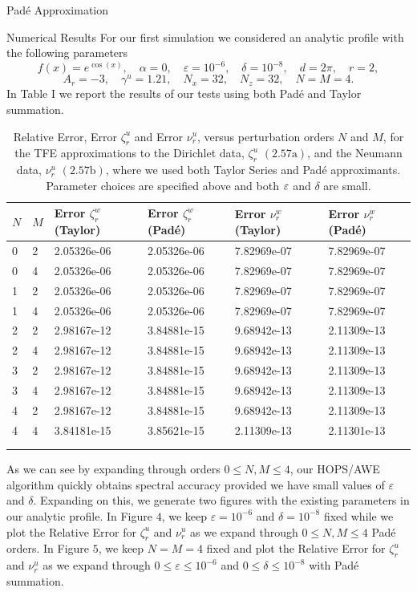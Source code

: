 \begin{section}{Pad\'e Approximation}
\begin{section}{Numerical Results}
For our first simulation we considered an analytic profile with the following parameters
$$f(x)=e^{\cos(x)},\quad \alpha = 0, \quad \varepsilon = 10^{-6}, \quad \delta = 10^{-8}, \quad d=2\pi,\quad r=2,$$
$$A_r=-3,\quad \gamma^u = 1.21, \quad N_x = 32,\quad N_z=32, \quad N=M=4.$$
In Table I we report the results of our tests using both Padé and Taylor summation.
\vspace{3mm}
\label{First Numerical Tests Upper Layer}
\setcounter{table}{0}
\begin{longtable}[c]{llllll} \toprule
    {$N$} & {$M$} & {Error ${\zeta^w_r}$ (Taylor)} & {Error $\zeta^w_r$ (Padé)} & {Error $\nu^w_r$ (Taylor)} & {Error $\nu^w_r$ (Padé)}  \\ \midrule
0 & 2 & 2.05326e-06 & 2.05326e-06 & 7.82969e-07 & 7.82969e-07 \\
0 & 4 & 2.05326e-06 & 2.05326e-06 & 7.82969e-07 & 7.82969e-07 \\
1 & 2 & 2.05326e-06 & 2.05326e-06 & 7.82969e-07 & 7.82969e-07 \\
1 & 4 & 2.05326e-06 & 2.05326e-06 & 7.82969e-07 & 7.82969e-07 \\
2 & 2 & 2.98167e-12 & 3.84881e-15 & 9.68942e-13 & 2.11309e-13 \\
2 & 4 & 2.98167e-12 & 3.84881e-15 & 9.68942e-13 & 2.11309e-13 \\
3 & 2 & 2.98167e-12 & 3.84881e-15 & 9.68942e-13 & 2.11309e-13 \\
3 & 4 & 2.98167e-12 & 3.84881e-15 & 9.68942e-13 & 2.11309e-13 \\
4 & 2 & 2.98167e-12 & 3.84881e-15 & 9.68942e-13 & 2.11309e-13 \\
4 & 4 & 3.84181e-15 & 3.85621e-15 & 2.11309e-13 & 2.11301e-13 \\ \bottomrule
\\
\caption{Relative Error, Error ${\zeta^u_r}$ and Error $\nu^u_r$, versus perturbation orders $N$ and $M$, for the TFE approximations to the Dirichlet data, $\zeta^u_r$ $(2.57\text{a})$, and the Neumann data, $\nu^u_r$ $(2.57\text{b})$, where we used both Taylor Series and Padé approximants. Parameter choices are specified above and both $\varepsilon$ and $\delta$ are small.}
\end{longtable}

\vspace{-1mm}
As we can see by expanding through orders $0 \leq N,M \leq 4$, our HOPS/AWE algorithm quickly obtains spectral accuracy provided we have small values of $\varepsilon$ and $\delta$. Expanding on this, we generate two figures with the existing parameters in our analytic profile. In Figure $4$, we keep $\varepsilon = 10^{-6}$ and $\delta = 10^{-8}$ fixed while we plot the Relative Error for $\zeta^u_r$ and $\nu^u_r$ as we expand through $0 \leq N,M \leq 4$ Padé orders. In Figure $5$, we keep $N=M=4$ fixed and plot the Relative Error for $\zeta^u_r$ and $\nu^u_r$ as we expand through $0 \leq \varepsilon \leq 10^{-6}$ and $ 0 \leq \delta \leq 10^{-8}$ with Padé summation.


\end{section}
\end{section}
